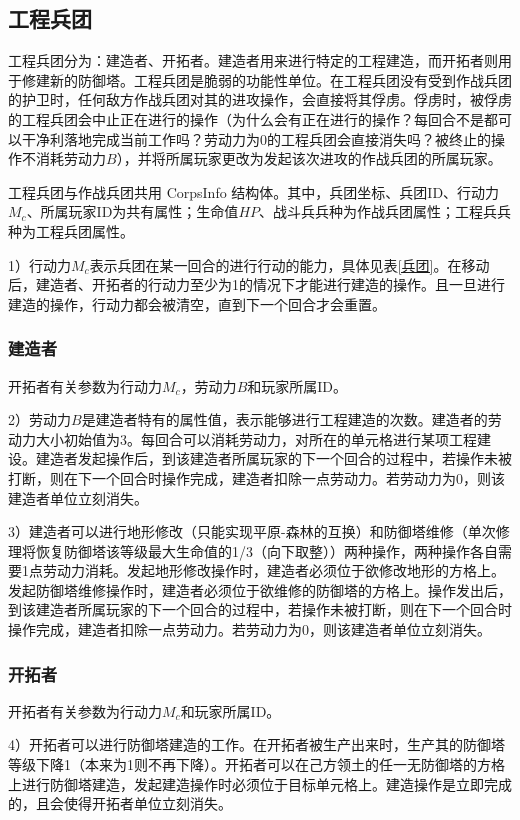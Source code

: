 \documentclass[a4paper,4pt]{article}
\begin{document}
\subsection{工程兵团}
工程兵团分为：建造者、开拓者。建造者用来进行特定的工程建造，而开拓者则用于修建新的防御塔。工程兵团是脆弱的功能性单位。在工程兵团没有受到作战兵团的护卫时，任何敌方作战兵团对其的进攻操作，会直接将其俘虏。俘虏时，被俘虏的工程兵团会中止正在进行的操作（为什么会有正在进行的操作？每回合不是都可以干净利落地完成当前工作吗？劳动力为0的工程兵团会直接消失吗？被终止的操作不消耗劳动力$B$），并将所属玩家更改为发起该次进攻的作战兵团的所属玩家。\par%
工程兵团与作战兵团共用 CorpsInfo 结构体。其中，兵团坐标、兵团ID、行动力$M_c$、所属玩家ID为共有属性；生命值$HP$、战斗兵兵种为作战兵团属性；工程兵兵种为工程兵团属性。\par %
1）行动力$M_c$表示兵团在某一回合的进行行动的能力，具体见表\ref{兵团}。在移动后，建造者、开拓者的行动力至少为1的情况下才能进行建造的操作。且一旦进行建造的操作，行动力都会被清空，直到下一个回合才会重置。\par
\subsubsection{建造者}
开拓者有关参数为行动力$M_c$，劳动力$B$和玩家所属ID。\par
2）劳动力$B$是建造者特有的属性值，表示能够进行工程建造的次数。建造者的劳动力大小初始值为3。每回合可以消耗劳动力，对所在的单元格进行某项工程建设。建造者发起操作后，到该建造者所属玩家的下一个回合的过程中，若操作未被打断，则在下一个回合时操作完成，建造者扣除一点劳动力。若劳动力为0，则该建造者单位立刻消失。\par %
3）建造者可以进行地形修改（只能实现平原-森林的互换）和防御塔维修（单次修理将恢复防御塔该等级最大生命值的1/3（向下取整））两种操作，两种操作各自需要1点劳动力消耗。发起地形修改操作时，建造者必须位于欲修改地形的方格上。发起防御塔维修操作时，建造者必须位于欲维修的防御塔的方格上。操作发出后，到该建造者所属玩家的下一个回合的过程中，若操作未被打断，则在下一个回合时操作完成，建造者扣除一点劳动力。若劳动力为0，则该建造者单位立刻消失。
\subsubsection{开拓者}
开拓者有关参数为行动力$M_c$和玩家所属ID。\par
4）开拓者可以进行防御塔建造的工作。在开拓者被生产出来时，生产其的防御塔等级下降1（本来为1则不再下降）。开拓者可以在己方领土的任一无防御塔的方格上进行防御塔建造，发起建造操作时必须位于目标单元格上。建造操作是立即完成的，且会使得开拓者单位立刻消失。
\end{document}
